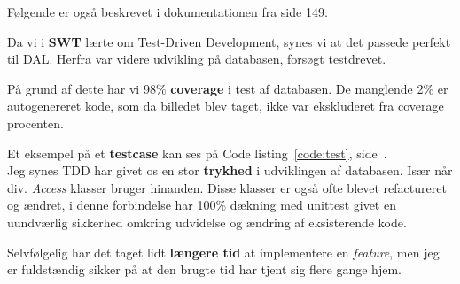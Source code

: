 Følgende er også beskrevet i dokumentationen fra side 149.

Da vi i \textbf{SWT} lærte om Test-Driven Development, synes vi at det passede perfekt til DAL. Herfra var videre udvikling på databasen, forsøgt testdrevet. 

På grund af dette har vi 98\% \textbf{coverage} i test af databasen. De manglende 2\% er autogenereret kode, som da billedet blev taget, ikke var ekskluderet fra coverage procenten.

Et eksempel på et \textbf{testcase} kan ses på Code listing~\ref{code:test}, side~\pageref{code:test}.\\

Jeg synes TDD har givet os en stor \textbf{trykhed} i udviklingen af databasen. Især når div. \textit{Access} klasser bruger hinanden. Disse klasser er også ofte blevet refactureret og ændret, i denne forbindelse har 100\% dækning med unittest givet en uundværlig sikkerhed omkring udvidelse og ændring af eksisterende kode.

Selvfølgelig har det taget lidt \textbf{længere tid} at implementere en \textit{feature}, men jeg er fuldstændig sikker på at den brugte tid har tjent sig flere gange hjem. 